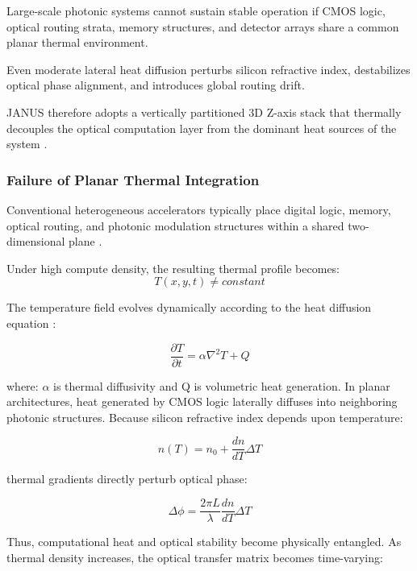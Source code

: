 \documentclass[journal]{IEEEtran}
\begin{document}
Large-scale photonic systems cannot sustain stable operation if CMOS logic, optical routing strata, memory structures, and detector arrays share a common planar thermal environment.

Even moderate lateral heat diffusion perturbs silicon refractive index, destabilizes optical phase alignment, and introduces global routing drift.

JANUS therefore adopts a vertically partitioned 3D Z-axis stack that thermally decouples the optical computation layer from the dominant heat sources of the system \cite{Skacel2021,Chang2017}.

\subsubsection{\textbf{Failure of Planar Thermal Integration}}

Conventional heterogeneous accelerators typically place digital logic, memory, optical routing, and photonic modulation structures within
a shared two-dimensional plane \cite{Atabaki2018,Stucchi2019}.

Under high compute density, the resulting thermal profile becomes:
\begin{equation}
T (x, y, t) \neq  constant
\end{equation}

The temperature field evolves dynamically according to the heat diffusion equation \cite{Incropera2006}:

\begin{equation}
\frac {\partial T}{\partial t}
= \alpha\nabla^{2} T + Q
\end{equation}

where: $\alpha$ is thermal diffusivity and Q is volumetric heat generation.
In planar architectures, heat generated by CMOS logic laterally diffuses into neighboring photonic structures.
Because silicon refractive index depends upon temperature:

\begin{equation}
n(T ) = n_0 + \frac{dn}{dT}  \Delta T
\end{equation}

thermal gradients directly perturb optical phase:

\begin{equation}
\Delta \phi = \frac{2\pi L}{\lambda} \frac{dn}{dT} \Delta T
\end{equation}

Thus, computational heat and optical stability become physically entangled. As thermal density increases, the optical transfer matrix becomes time-varying:
\end{document}
